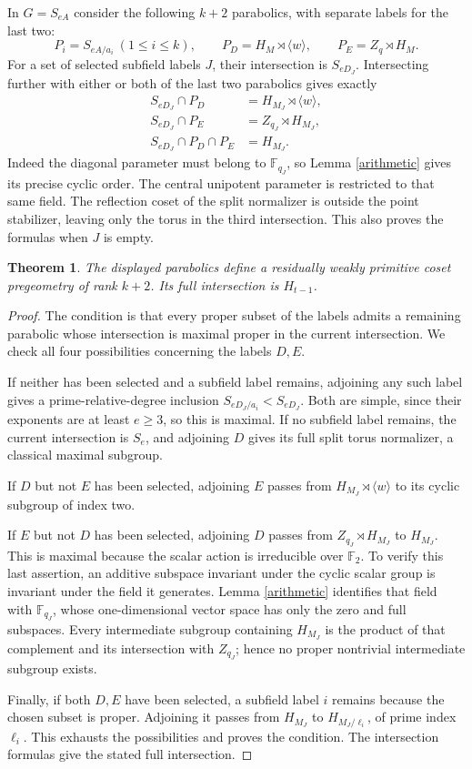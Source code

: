 \documentclass[11pt,a4paper]{article}
\newtheorem{theorem}[lemma]{Theorem}
\newcommand{\F}{\mathbb F}
\newcommand{\gen}[1]{\langle#1\rangle}
\begin{document}
In $G=S_{eA}$ consider the following $k+2$ parabolics, with separate
labels for the last two:
\[
 P_i=S_{eA/a_i}\ (1\le i\le k),\qquad
 P_D=H_M\rtimes\gen{w},\qquad P_E=Z_q\rtimes H_M.
\]
For a set of selected subfield labels $J$, their intersection is
$S_{eD_J}$. Intersecting further with either or both of the last two
parabolics gives exactly
\begin{align*}
 S_{eD_J}\cap P_D&=H_{M_J}\rtimes\gen{w},\\
 S_{eD_J}\cap P_E&=Z_{q_J}\rtimes H_{M_J},\\
 S_{eD_J}\cap P_D\cap P_E&=H_{M_J}.
\end{align*}
Indeed the diagonal parameter must belong to $\F_{q_J}$, so Lemma
\ref{arithmetic} gives its precise cyclic order. The central unipotent
parameter is restricted to that same field. The reflection coset of
the split normalizer is outside the point stabilizer, leaving only
the torus in the third intersection. This also proves the formulas
when $J$ is empty.

\begin{theorem}\label{family}
The displayed parabolics define a residually weakly primitive coset
pregeometry of rank $k+2$. Its full intersection is $H_{t-1}$.
\end{theorem}
\begin{proof}
The condition is that every proper subset of the labels admits a
remaining parabolic whose intersection is maximal proper in the
current intersection. We check all four possibilities concerning
the labels $D,E$.

If neither has been selected and a subfield label remains, adjoining
any such label gives a prime-relative-degree inclusion
$S_{eD_J/a_i}<S_{eD_J}$. Both are simple, since their exponents are
at least $e\ge3$, so this is maximal. If no subfield label remains,
the current intersection is $S_e$, and adjoining $D$ gives its full
split torus normalizer, a classical maximal subgroup.

If $D$ but not $E$ has been selected, adjoining $E$ passes from
$H_{M_J}\rtimes\gen{w}$ to its cyclic subgroup of index two.

If $E$ but not $D$ has been selected, adjoining $D$ passes from
$Z_{q_J}\rtimes H_{M_J}$ to $H_{M_J}$. This is maximal because
the scalar action is irreducible over $\F_2$. To verify this last
assertion, an additive subspace invariant under the cyclic scalar
group is invariant under the field it generates. Lemma
\ref{arithmetic} identifies that field with $\F_{q_J}$, whose
one-dimensional vector space has only the zero and full subspaces.
Every intermediate subgroup containing $H_{M_J}$ is the product of
that complement and its intersection with $Z_{q_J}$; hence no proper
nontrivial intermediate subgroup exists.

Finally, if both $D,E$ have been selected, a subfield label $i$ remains
because the chosen subset is proper. Adjoining it passes from
$H_{M_J}$ to $H_{M_J/\ell_i}$, of prime index $\ell_i$.
This exhausts the possibilities and proves the condition. The
intersection formulas give the stated full intersection.
\end{proof}
\end{document}
